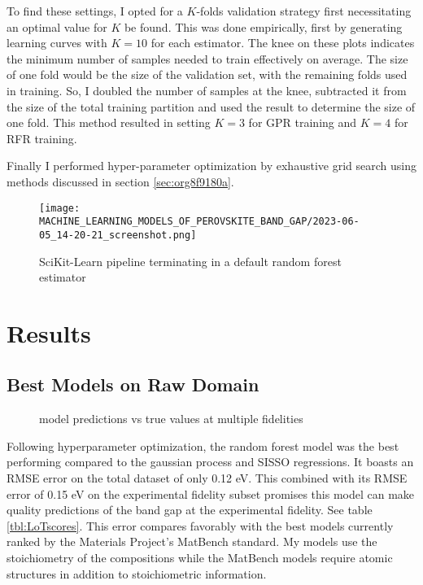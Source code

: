 To find these settings, I opted for a \(K\)-folds validation strategy first necessitating an optimal value for \(K\) be found.
This was done empirically, first by generating learning curves with \(K=10\) for each estimator.
The knee on these plots indicates the minimum number of samples needed to train effectively on average.
The size of one fold would be the size of the validation set, with the remaining folds used in training.
So, I doubled the number of samples at the knee, subtracted it from the size of the total training partition and used the result to determine the size of one fold.
This method resulted in setting \(K = 3\) for GPR training and \(K = 4\) for RFR training.

Finally I performed hyper-parameter optimization by exhaustive grid search using methods discussed in section \ref{sec:org8f9180a}.

\begin{figure}[htbp]
\centering
\texttt{[image: MACHINE\_LEARNING\_MODELS\_OF\_PEROVSKITE\_BAND\_GAP/2023-06-05\_14-20-21\_screenshot.png]}
\caption{\label{fig:pipe} SciKit-Learn pipeline terminating in a default random forest estimator}
\end{figure}

\section{Results}
\label{sec:org7802582}
\subsection{Best Models on Raw Domain}
\label{sec:orgb2d5fd7}
 
\begin{figure}[htbp]
\centering

\caption{\label{fig:pairplots} model predictions vs true values at multiple fidelities}
\end{figure}

Following hyperparameter optimization, the random forest model was the best performing compared to the gaussian process and SISSO regressions.
It boasts an RMSE error on the total dataset of only 0.12 \unit{\electronvolt}.
This combined with its RMSE error of 0.15 \unit{\electronvolt} on the experimental fidelity subset promises this model can make quality predictions of the band gap at the experimental fidelity.
See table \ref{tbl:LoTscores}.
This error compares favorably with the best models currently ranked by the Materials Project's MatBench standard\autocite{dunn-2020-bench-mater}.
My models use the stoichiometry of the compositions while the MatBench models require atomic structures in addition to stoichiometric information.


